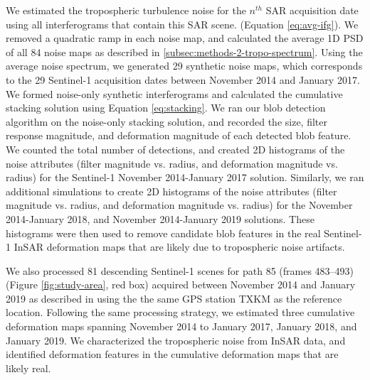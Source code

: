 \documentclass{utexasthesis}
\begin{document}
We estimated the tropospheric turbulence noise for the $n^{th}$ SAR acquisition date using all interferograms that contain this SAR scene. (Equation \eqref{eq:avg-ifg}). We removed a quadratic ramp in each noise map, and calculated the average 1D PSD of all 84 noise maps as described in \ref{subsec:methods-2-tropo-spectrum}.
Using the average noise spectrum, we generated 29 synthetic noise maps, which corresponds to the 29 Sentinel-1 acquisition dates between November 2014 and January 2017. We formed noise-only synthetic interferograms and calculated the cumulative stacking solution using Equation \eqref{eq:stacking}. We ran our blob detection algorithm on the noise-only stacking solution, and recorded the size, filter response magnitude, and deformation magnitude of each detected blob feature. We counted the total number of detections, and created 2D histograms of the noise attributes (filter magnitude vs. radius, and deformation magnitude vs. radius) for the Sentinel-1 November 2014-January 2017 solution.
Similarly, we ran additional simulations to create 2D histograms of the noise attributes (filter magnitude vs. radius, and deformation magnitude vs. radius) for the November 2014-January 2018, and November 2014-January 2019 solutions.
These histograms were then used to remove candidate blob features in the real Sentinel-1 InSAR deformation maps that are likely due to tropospheric noise artifacts.

We also processed 81 descending Sentinel-1 scenes for path 85 (frames 483–493) (Figure \ref{fig:study-area}, red box) acquired between November 2014 and January 2019 as described in \cite{Staniewicz2020InsarRevealsComplex} using the the same GPS station TXKM as the reference location. Following the same processing strategy, we estimated three cumulative deformation maps spanning November 2014 to January 2017, January 2018, and January 2019. We characterized the tropospheric noise from InSAR data, and identified deformation features in the cumulative deformation maps that are likely real.
\end{document}
